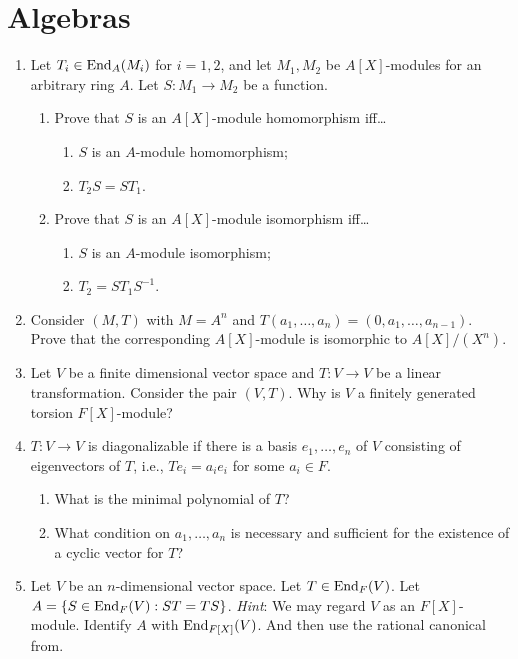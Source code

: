 \documentclass[../psets.tex]{subfiles}
\begin{document}
\section{Algebras}
\begin{enumerate}
    \item {}Let $T_i\in\operatorname{End}_A(M_i)$ for $i=1,2$, and let $M_1,M_2$ be $A[X]$-modules for an arbitrary ring $A$. Let $S:M_1\to M_2$ be a function.
    \begin{enumerate}
        \item Prove that $S$ is an $A[X]$-module homomorphism iff\dots
        \begin{enumerate}[label={(\alph*)}]
            \item $S$ is an $A$-module homomorphism;
            \item $T_2S=ST_1$.
        \end{enumerate}
        \item Prove that $S$ is an $A[X]$-module isomorphism iff\dots
        \begin{enumerate}[label={(\alph*)}]
            \item $S$ is an $A$-module isomorphism;
            \item $T_2=ST_1S^{-1}$.
        \end{enumerate}
    \end{enumerate}
    \item Consider $(M,T)$ with $M=A^n$ and $T(a_1,\dots,a_n)=(0,a_1,\dots,a_{n-1})$. Prove that the corresponding $A[X]$-module is isomorphic to $A[X]/(X^n)$.
    \item Let $V$ be a finite dimensional vector space and $T:V\to V$ be a linear transformation. Consider the pair $(V,T)$. Why is $V$ a finitely generated torsion $F[X]$-module?
    \item $T:V\to V$ is diagonalizable if there is a basis $e_1,\dots,e_n$ of $V$ consisting of eigenvectors of $T$, i.e., $Te_i=a_ie_i$ for some $a_i\in F$.
    \begin{enumerate}
        \item What is the minimal polynomial of $T$?
        \item What condition on $a_1,\dots,a_n$ is necessary and sufficient for the existence of a cyclic vector for $T$?
    \end{enumerate}
    \item Let $V$ be an $n$-dimensional vector space. Let $T\in\operatorname{End}_F(V)$. Let $A=\{S\in\operatorname{End}_F(V):ST=TS\}$. \emph{Hint}: We may regard $V$ as an $F[X]$-module. Identify $A$ with $\operatorname{End}_{F[X]}(V)$. And then use the rational canonical from.

\end{enumerate}
\end{document}
